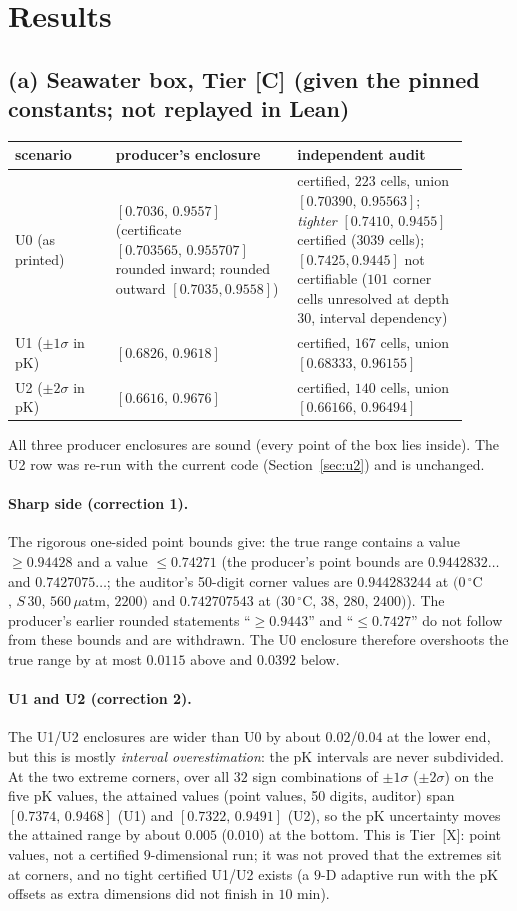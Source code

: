 \documentclass[10pt]{article}
\newcommand{\tier}[1]{\textsf{[#1]}}
\newcommand{\tC}{\tier{C}}
\newcommand{\tX}{\tier{X}}
\begin{document}
\section{Results}\label{sec:results}
\subsection{(a) Seawater box, Tier \tC{} (given the pinned constants; not replayed in Lean)}
\begin{center}\small\begin{tabular}{p{0.20\linewidth}p{0.36\linewidth}p{0.34\linewidth}}\toprule
scenario & producer's enclosure & independent audit\\\midrule
U0 (as printed) & $[0.7036,\,0.9557]$ (certificate $[0.703565,\,0.955707]$ rounded inward; rounded outward $[0.7035,0.9558]$) & certified, $223$ cells, union $[0.70390,\,0.95563]$; \emph{tighter} $[0.7410,\,0.9455]$ certified ($3039$ cells); $[0.7425,0.9445]$ not certifiable ($101$ corner cells unresolved at depth $30$, interval dependency)\\
U1 ($\pm1\sigma$ in pK) & $[0.6826,\,0.9618]$ & certified, $167$ cells, union $[0.68333,\,0.96155]$\\
U2 ($\pm2\sigma$ in pK) & $[0.6616,\,0.9676]$ & certified, $140$ cells, union $[0.66166,\,0.96494]$\\\bottomrule
\end{tabular}\end{center}
All three producer enclosures are sound (every point of the box lies inside). The U2 row was re-run with the current code (Section~\ref{sec:u2}) and is unchanged.
\paragraph{Sharp side (correction 1).} The rigorous one-sided point bounds give: the true range contains a value $\ge0.94428$ and a value $\le0.74271$ (the producer's point bounds are $0.9442832\ldots$ and $0.7427075\ldots$; the auditor's 50-digit corner values are $0.944283244$ at $(0\,^\circ$C$,\,S\,30,\,560\,\mu$atm$,\,2200)$ and $0.742707543$ at $(30\,^\circ$C$,\,38,\,280,\,2400)$). The producer's earlier rounded statements ``$\ge0.9443$'' and ``$\le0.7427$'' do not follow from these bounds and are withdrawn. The U0 enclosure therefore overshoots the true range by at most $0.0115$ above and $0.0392$ below.
\paragraph{U1 and U2 (correction 2).} The U1/U2 enclosures are wider than U0 by about $0.02$/$0.04$ at the lower end, but this is mostly \emph{interval overestimation}: the pK intervals are never subdivided. At the two extreme corners, over all $32$ sign combinations of $\pm1\sigma$ ($\pm2\sigma$) on the five pK values, the attained values (point values, 50 digits, auditor) span $[0.7374,\,0.9468]$ (U1) and $[0.7322,\,0.9491]$ (U2), so the pK uncertainty moves the attained range by about $0.005$ ($0.010$) at the bottom. This is Tier~\tX{}: point values, not a certified $9$-dimensional run; it was not proved that the extremes sit at corners, and no tight certified U1/U2 exists (a $9$-D adaptive run with the pK offsets as extra dimensions did not finish in $10$ min).
\end{document}
